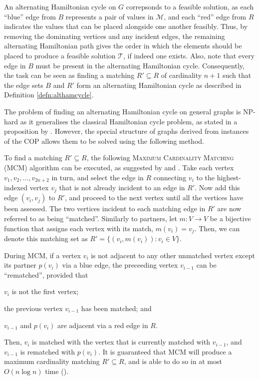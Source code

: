 \documentclass[oribibl]{llncs}
\begin{document}
An alternating Hamiltonian cycle on $G$ correpsonds to a feasible solution, as each ``blue'' edge from $B$ represents a pair of values in $\mathcal{M}$, and each ``red'' edge from $R$ indicates the values that can be placed alongside one another feasibly. Thus, by removing the dominating vertices and any incident edges, the remaining alternating Hamiltonian path gives the order in which the elements should be placed to produce a feasible solution $\mathcal{T}$, if indeed one exists. Also, note that every edge in $B$ must be present in the alternating Hamiltonian cycle. Consequently, the task can be seen as finding a matching $R' \subseteq R$ of cardinality $n+1$ such that the edge sets $B$ and $R'$ form an alternating Hamiltonian cycle as described in Definition \ref{defn:althamcycle}. 

The problem of finding an alternating Hamiltonian cycle on general graphs is NP-hard as it generalises the classical Hamiltonian cycle problem, as stated in a proposition by \cite{haggkvist1977}. However, the special structure of graphs derived from instances of the COP allows them to be solved using the following method.

To find a matching $R' \subseteq R$, the following \textsc{Maximum Cardinality Matching} (MCM) algorithm can be executed, as suggested by \cite{mahadev1994} and \cite{becker2010}. Take each vertex $v_1, v_2,..., v_{2n+2}$ in turn, and select the edge in $R$ connecting $v_i$ to the highest-indexed vertex $v_j$ that is not already incident to an edge in $R'$. Now add this edge $(v_i, v_j)$ to $R'$, and proceed to the next vertex until all the vertices have been assessed. The two vertices incident to each matching edge in $R'$ are now referred to as being ``matched''. Similarly to partners, let $m : V \to V$ be a bijective function that assigns each vertex with its match, $m(v_i) = v_j$. Then, we can denote this matching set as $R' =\{(v_i, m(v_i)) : v_i \in V\}$. 

During MCM, if a vertex $v_i$ is not adjacent to any other unmatched vertex except its partner $p(v_i)$ via a blue edge, the preceeding vertex $v_{i-1}$ can be ``rematched'', provided that 
\begin{enumerate*}[label={(\alph*)}]
	\item $v_i$ is not the first vertex; 
	\item the previous vertex $v_{i-1}$ has been matched; and
	\item $v_{i-1}$ and $p(v_i)$ are adjacent via a red edge in $R$.
\end{enumerate*}
Then, $v_i$ is matched with the vertex that is currently matched with $v_{i-1}$, and $v_{i-1}$ is rematched with $p(v_i)$. It is guaranteed that MCM will produce a maximum cardinality matching $R' \subseteq R$, and is able to do so in at most $O(n \log n)$ time (\citealp{mahadev1994}).
\end{document}
